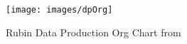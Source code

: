 \begin{figure}
\begin{centering}
\texttt{[image: images/dpOrg]}
	\caption{Rubin Data Production Org Chart from \cite{RTN-001}\label{fig:dporg}}
\end{centering}
\end{figure}
